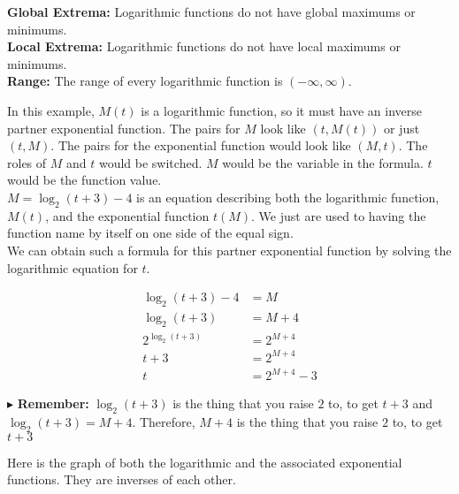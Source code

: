 \documentclass{ximera}
\begin{document}
\begin{example}
\begin{explanation}
\textbf{Global Extrema:} Logarithmic functions do not have global maximums or minimums. \\


\textbf{Local Extrema:} Logarithmic functions do not have local maximums or minimums. \\



\textbf{Range:} The range of every logarithmic function is $(-\infty, \infty)$.




\end{explanation}

\end{example}



In this example, $M(t)$ is a logarithmic function, so it must have an inverse partner exponential function.  The pairs for $M$ look like $(t, M(t))$ or just $(t,M)$. The pairs for the exponential function would look like $(M, t)$.  The roles of $M$ and $t$ would be switched. $M$ would be the variable in the formula. $t$ would be the function value.\\


$M = \log_2(t+3) - 4$ is an equation describing both the logarithmic function, $M(t)$, and the exponential function $t(M)$.  We just are used to having the function name by itself on one side of the equal sign. \\


We can obtain such a formula for this partner exponential function by solving the logarithmic equation for $t$.





\begin{align*}
\log_2(t+3) - 4 & = M \\
\log_2(t+3) & = M + 4 \\
2^{\log_2(t+3)} & = 2^{M+4} \\
t+3 & = 2^{M+4} \\
t & = 2^{M+4} - 3
\end{align*}


$\blacktriangleright$ \textbf{Remember:} $\log_2(t+3)$ is the thing that you raise $2$ to, to get $t+3$ and $\log_2(t+3) = M+4$.  Therefore, $M+4$ is the thing that you raise $2$ to, to get $t+3$





Here is the graph of both the logarithmic and the associated exponential functions. They are inverses of each other.
\end{document}
